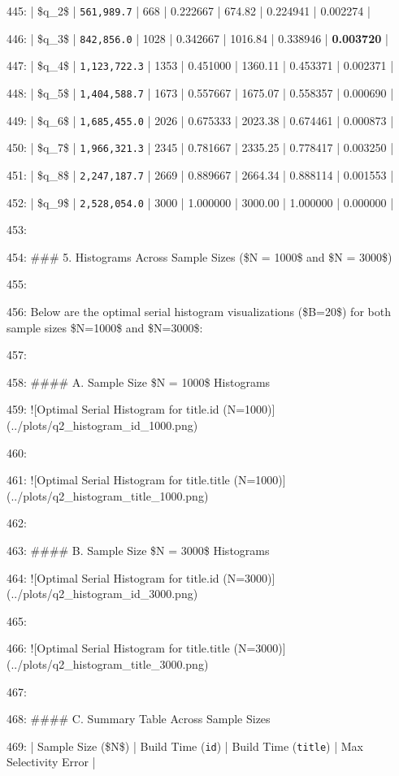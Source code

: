 \documentclass[11pt,a4paper]{article}
\begin{document}
445: | \$q\_2\$ | \texttt{561,989.7} | 668 | 0.222667 | 674.82 | 0.224941 | 0.002274 |

446: | \$q\_3\$ | \texttt{842,856.0} | 1028 | 0.342667 | 1016.84 | 0.338946 | \textbf{0.003720} |

447: | \$q\_4\$ | \texttt{1,123,722.3} | 1353 | 0.451000 | 1360.11 | 0.453371 | 0.002371 |

448: | \$q\_5\$ | \texttt{1,404,588.7} | 1673 | 0.557667 | 1675.07 | 0.558357 | 0.000690 |

449: | \$q\_6\$ | \texttt{1,685,455.0} | 2026 | 0.675333 | 2023.38 | 0.674461 | 0.000873 |

450: | \$q\_7\$ | \texttt{1,966,321.3} | 2345 | 0.781667 | 2335.25 | 0.778417 | 0.003250 |

451: | \$q\_8\$ | \texttt{2,247,187.7} | 2669 | 0.889667 | 2664.34 | 0.888114 | 0.001553 |

452: | \$q\_9\$ | \texttt{2,528,054.0} | 3000 | 1.000000 | 3000.00 | 1.000000 | 0.000000 |

453:

454: \#\#\# 5. Histograms Across Sample Sizes (\$N = 1000\$ and \$N = 3000\$)

455:

456: Below are the optimal serial histogram visualizations (\$B=20\$) for both sample sizes \$N=1000\$ and \$N=3000\$:

457:

458: \#\#\#\# A. Sample Size \$N = 1000\$ Histograms

459: ![Optimal Serial Histogram for title.id (N=1000)](../plots/q2\_histogram\_id\_1000.png)

460:

461: ![Optimal Serial Histogram for title.title (N=1000)](../plots/q2\_histogram\_title\_1000.png)

462:

463: \#\#\#\# B. Sample Size \$N = 3000\$ Histograms

464: ![Optimal Serial Histogram for title.id (N=3000)](../plots/q2\_histogram\_id\_3000.png)

465:

466: ![Optimal Serial Histogram for title.title (N=3000)](../plots/q2\_histogram\_title\_3000.png)

467:

468: \#\#\#\# C. Summary Table Across Sample Sizes

469: | Sample Size (\$N\$) | Build Time (\texttt{id}) | Build Time (\texttt{title}) | Max Selectivity Error |
\end{document}
